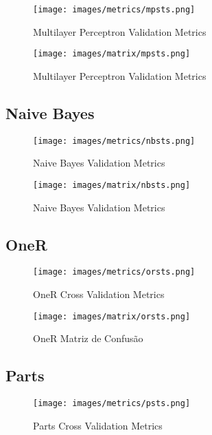 \begin{figure}[H]
  \centering
  \texttt{[image: images/metrics/mpsts.png]}
  \caption{Multilayer Perceptron Validation Metrics}
  \label{fig:mp_sts_metrics}
\end{figure}

\begin{figure}[H]
  \centering
  \texttt{[image: images/matrix/mpsts.png]}
  \caption{Multilayer Perceptron Validation Metrics}
  \label{fig:mp_sts_matrix}
\end{figure}

\subsection{Naive Bayes}

\begin{figure}[H]
  \centering
  \texttt{[image: images/metrics/nbsts.png]}
  \caption{Naive Bayes Validation Metrics}
  \label{fig:nb_sts_metrics}
\end{figure}

\begin{figure}[H]
  \centering
  \texttt{[image: images/matrix/nbsts.png]}
  \caption{Naive Bayes Validation Metrics}
  \label{fig:nb_sts_matrix}
\end{figure}

\subsection{OneR}

\begin{figure}[H]
  \centering
  \texttt{[image: images/metrics/orsts.png]}
  \caption{OneR Cross Validation Metrics}
  \label{fig:or_sts_metrics}
\end{figure}

\begin{figure}[H]
  \centering
  \texttt{[image: images/matrix/orsts.png]}
  \caption{OneR Matriz de Confusão}
  \label{fig:or_sts_matrix}
\end{figure}

\subsection{Parts}

\begin{figure}[H]
  \centering
  \texttt{[image: images/metrics/psts.png]}
  \caption{Parts Cross Validation Metrics}
  \label{fig:p_sts_metrics}
\end{figure}

